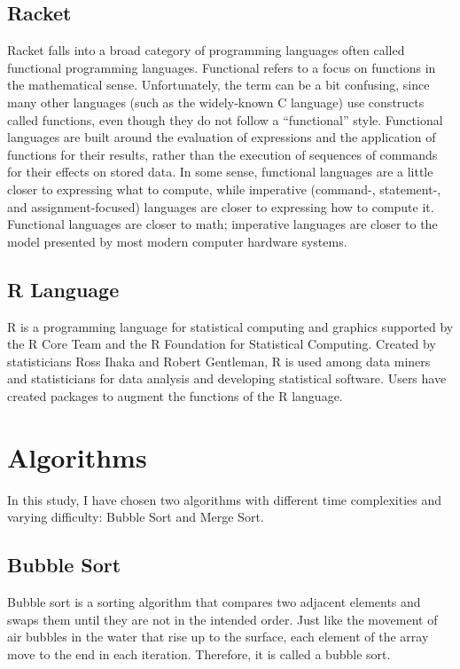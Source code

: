 \documentclass[]{report}
\begin{document}
	    	\subsection{Racket}
	    	Racket falls into a broad category of programming languages often called functional programming languages. Functional refers to a focus on functions in the mathematical sense. Unfortunately, the term can be a bit confusing, since many other languages (such as the widely-known C language) use constructs called functions, even though they do not follow a “functional” style. Functional languages are built around the evaluation of expressions and the application of functions for their results, rather than the execution of sequences of commands for their effects on stored data. In some sense, functional languages are a little closer to expressing what to compute, while imperative (command-, statement-, and assignment-focused) languages are closer to expressing how to compute it. Functional languages are closer to math; imperative languages are closer to the model presented by most modern computer hardware systems. \cite{cs 251: racket}
	    	\subsection{R Language}
	    	R is a programming language for statistical computing and graphics supported by the R Core Team and the R Foundation for Statistical Computing. Created by statisticians Ross Ihaka and Robert Gentleman, R is used among data miners and statisticians for data analysis and developing statistical software. Users have created packages to augment the functions of the R language. \cite{wikipedia_2022:2}
	    	
	    \section{Algorithms}
	    In this study, I have chosen two algorithms with different time complexities and varying difficulty: Bubble Sort and Merge Sort.
	    	\subsection{Bubble Sort}
	    	Bubble sort is a sorting algorithm that compares two adjacent elements and swaps them until they are not in the intended order. Just like the movement of air bubbles in the water that rise up to the surface, each element of the array move to the end in each iteration. Therefore, it is called a bubble sort. \cite{programiz}
\end{document}
